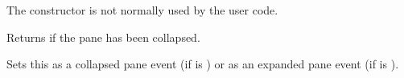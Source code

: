 The constructor is not normally used by the user code.


\label{wxcollapsiblepaneeventgetcollapsed}


Returns \true if the pane has been collapsed.


\label{wxcollapsiblepaneeventsetcollapsed}


Sets this as a collapsed pane event (if  is \true) or as an expanded
pane event (if  is \false).

